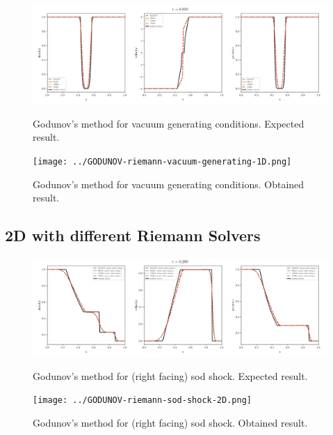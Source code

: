     \begin{figure}[htbp]
        \centering
        \includegraphics[width=.9\textwidth]{./figures/GODUNOV-riemann-vacuum-generating-1D.png}%
        \caption{Godunov's method for vacuum generating conditions. Expected result.}
        \texttt{[image: ../GODUNOV-riemann-vacuum-generating-1D.png]}%
        \caption{Godunov's method for vacuum generating conditions. Obtained result.}
    \end{figure}








\subsection{2D with different Riemann Solvers}

    \begin{figure}[htbp]
        \centering
        \includegraphics[width=.9\textwidth]{./figures/GODUNOV-riemann-sod-shock-2D.png}%
        \caption{Godunov's method for (right facing) sod shock. Expected result.}
        \texttt{[image: ../GODUNOV-riemann-sod-shock-2D.png]}%
        \caption{Godunov's method for (right facing) sod shock. Obtained result.}
    \end{figure}


